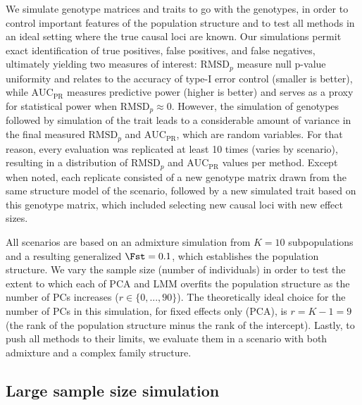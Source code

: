 \documentclass[11pt]{article}
\newcommand{\rmsd}{\text{RMSD}_p}
\newcommand{\auc}{\text{AUC}_\text{PR}}
\begin{document}
We simulate genotype matrices and traits to go with the genotypes, in order to control important features of the population structure and to test all methods in an ideal setting where the true causal loci are known.
Our simulations permit exact identification of true positives, false positives, and false negatives, ultimately yielding two measures of interest: $\rmsd$ measure null p-value uniformity and relates to the accuracy of type-I error control (smaller is better), while $\auc$ measures predictive power (higher is better) and serves as a proxy for statistical power when $\rmsd \approx 0$.
However, the simulation of genotypes followed by simulation of the trait leads to a considerable amount of variance in the final measured $\rmsd$ and $\auc$, which are random variables.
For that reason, every evaluation was replicated at least 10 times (varies by scenario), resulting in a distribution of $\rmsd$ and $\auc$ values per method.
Except when noted, each replicate consisted of a new genotype matrix drawn from the same structure model of the scenario, followed by a new simulated trait based on this genotype matrix, which included selecting new causal loci with new effect sizes.

All scenarios are based on an admixture simulation from $K=10$ subpopulations and a resulting generalized $\Fst = 0.1$, which establishes the population structure.
We vary the sample size (number of individuals) in order to test the extent to which each of PCA and LMM overfits the population structure as the number of PCs increases ($r \in \{0, ..., 90\}$).
The theoretically ideal choice for the number of PCs in this simulation, for fixed effects only (PCA), is $r = K-1 = 9$ (the rank of the population structure minus the rank of the intercept).
Lastly, to push all methods to their limits, we evaluate them in a scenario with both admixture and a complex family structure.

\subsection{Large sample size simulation}
\end{document}
